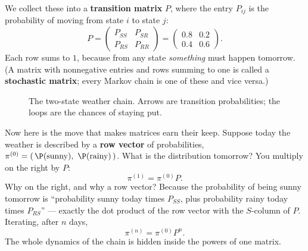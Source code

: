 We collect these into a \textbf{transition matrix} $P$, where the entry
$P_{ij}$ is the probability of moving from state $i$ to state $j$:
\[
  P = \begin{pmatrix} P_{SS} & P_{SR} \\ P_{RS} & P_{RR} \end{pmatrix}
    = \begin{pmatrix} 0.8 & 0.2 \\ 0.4 & 0.6 \end{pmatrix}.
\]
Each row sums to $1$, because from any state \emph{something} must happen
tomorrow. (A matrix with nonnegative entries and rows summing to one is called a
\textbf{stochastic matrix}; every Markov chain is one of these and vice versa.)

\begin{figure}[H]
  \centering
  \caption{The two-state weather chain. Arrows are transition probabilities;
  the loops are the chances of staying put.}
  \label{ch24:fig-weather-diagram}
\end{figure}

Now here is the move that makes matrices earn their keep. Suppose today the
weather is described by a \textbf{row vector} of probabilities,
$\pi^{(0)} = (\,\P(\text{sunny}),\ \P(\text{rainy})\,)$. What is the distribution
tomorrow? You multiply on the right by $P$:
\[
  \pi^{(1)} = \pi^{(0)} P.
\]
Why on the right, and why a row vector? Because the probability of being sunny
tomorrow is ``probability sunny today times $P_{SS}$, plus probability rainy
today times $P_{RS}$'' --- exactly the dot product of the row vector with the
$S$-column of $P$. Iterating, after $n$ days,
\[
  \pi^{(n)} = \pi^{(0)} P^n.
\]
The whole dynamics of the chain is hidden inside the powers of one matrix.

